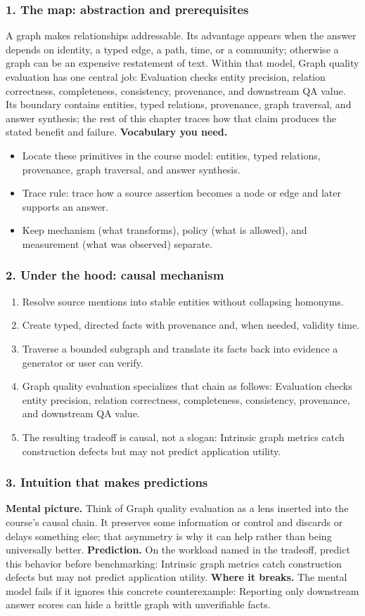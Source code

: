 \subsubsection*{1. The map: abstraction and prerequisites}
A graph makes relationships addressable. Its advantage appears when the answer depends on identity, a typed edge, a path, time, or a community; otherwise a graph can be an expensive restatement of text.
Within that model, Graph quality evaluation has one central job: Evaluation checks entity precision, relation correctness, completeness, consistency, provenance, and downstream QA value. Its boundary contains entities, typed relations, provenance, graph traversal, and answer synthesis; the rest of this chapter traces how that claim produces the stated benefit and failure.
\textbf{Vocabulary you need.}\begin{itemize}
\item Locate these primitives in the course model: entities, typed relations, provenance, graph traversal, and answer synthesis.
\item Trace rule: trace how a source assertion becomes a node or edge and later supports an answer.
\item Keep mechanism (what transforms), policy (what is allowed), and measurement (what was observed) separate.
\end{itemize}
\subsubsection*{2. Under the hood: causal mechanism}\begin{enumerate}
\item Resolve source mentions into stable entities without collapsing homonyms.
\item Create typed, directed facts with provenance and, when needed, validity time.
\item Traverse a bounded subgraph and translate its facts back into evidence a generator or user can verify.
\item Graph quality evaluation specializes that chain as follows: Evaluation checks entity precision, relation correctness, completeness, consistency, provenance, and downstream QA value.
\item The resulting tradeoff is causal, not a slogan: Intrinsic graph metrics catch construction defects but may not predict application utility.
\end{enumerate}
\subsubsection*{3. Intuition that makes predictions}
\textbf{Mental picture.} Think of Graph quality evaluation as a lens inserted into the course's causal chain. It preserves some information or control and discards or delays something else; that asymmetry is why it can help rather than being universally better.
\textbf{Prediction.} On the workload named in the tradeoff, predict this behavior before benchmarking: Intrinsic graph metrics catch construction defects but may not predict application utility.
\textbf{Where it breaks.} The mental model fails if it ignores this concrete counterexample: Reporting only downstream answer scores can hide a brittle graph with unverifiable facts.
